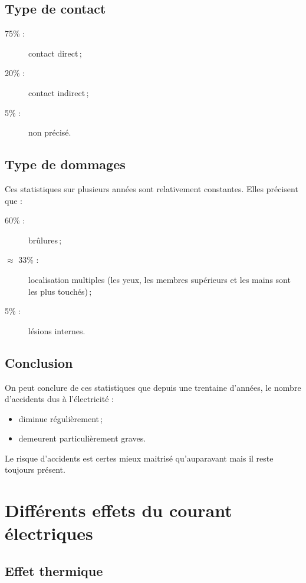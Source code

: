 \subsection{Type de contact}

\begin{description}
\item[75\% :] contact direct\,;
\item[20\% :] contact indirect\,;
\item[5\% :] non précisé.
\end{description}

\subsection{Type de dommages}

Ces statistiques sur plusieurs années sont relativement constantes. Elles précisent que :
\begin{description}
\item[60\% :] brûlures\,;
\item[$\approx$ 33\% :] localisation multiples (les yeux, les membres supérieurs et les mains sont les plus touchés)\,;
\item[5\% :] lésions internes.
\end{description}

\subsection{Conclusion}

On peut conclure de ces statistiques que depuis une trentaine d'années, le nombre d'accidents dus à l'électricité :
\begin{itemize}
\item diminue régulièrement\,;
\item demeurent particulièrement graves.
\end{itemize}

Le risque d'accidents est certes mieux maitrisé qu'auparavant mais il reste toujours présent.

\section{Différents effets du courant électriques\label{sec:effet_courant_électrique}}

\subsection{Effet thermique}

